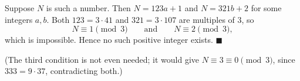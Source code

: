 Suppose $N$ is such a number. Then $N=123a+1$ and $N=321b+2$ for some integers $a,b$. Both $123=3\cdot41$ and $321=3\cdot107$ are multiples of $3$, so
\[
N\equiv1\pmod3\qquad\text{and}\qquad N\equiv2\pmod3,
\]
which is impossible. Hence no such positive integer exists. $\blacksquare$

(The third condition is not even needed; it would give $N\equiv3\equiv0\pmod 3$, since $333=9\cdot37$, contradicting both.)

